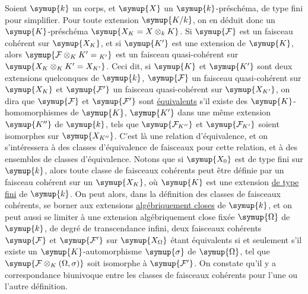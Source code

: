 Soient $\symup{k}$ un corps, et $\symup{X}$ un $\symup{k}$-préschéma, de type fini pour simplifier.
Pour toute extension $\symup{K/k}$, on en déduit donc un $\symup{K}$-préschéma
$\symup{X_K=X\otimes_k K}$. Si $\symup{\mathcal F}$ est un faisceau cohérent sur $\symup{X_K}$, et si
$\symup{K'}$ est une extension de $\symup{K}$, alors
$\symup{\mathcal F\otimes_K K'={}_{K'}}$ est un faisceau quasi-cohérent sur
$\symup{X_K\otimes_K K'=X_{K'}}$. Ceci dit, si $\symup{K}$ et $\symup{K'}$ sont deux extensions
quelconques de $\symup{k}$, $\symup{\mathcal F}$ un faisceau quasi-cohérent sur $\symup{X_K}$ et
$\symup{\mathcal F'}$
un faisceau quasi-cohérent sur $\symup{X_{K'}}$, on dira que $\symup{\mathcal F}$ et
$\symup{\mathcal F'}$ sont \uline{équivalents} s'il existe des $\symup{K}$-homomorphismes de
$\symup{K}$, $\symup{K'}$ dans une même extension $\symup{K''}$ de $\symup{k}$, tels que
$\symup{\mathcal F_{K''}}$ et $\symup{\mathcal F_{K'}}$ soient isomorphes sur $\symup{X_{K''}}$.
C'est là une relation d'équivalence, et on s'intéressera à des classes
d'équivalence de faisceaux pour cette relation, et à des ensembles de classes
d'équivalence. Notons que si $\symup{X_0}$ est de type fini sur
$\symup{k}$, alors toute classe de faisceaux cohérents peut être définie par un
faisceau cohérent sur un $\symup{X_K}$, où $\symup{K}$ est une extension \uline{de type fini} de $\symup{k}$.
On peut alors, dans la définition des classes de faisceaux cohérents, se borner
aux extensions \uline{algébriquement closes} de $\symup{k}$, et on peut aussi se limiter à une
extension algébriquement close fixée $\symup{\Omega}$ de $\symup{k}$, de degré de
transcendance infini, deux faisceaux cohérents $\symup{\mathcal F}$ et $\symup{\mathcal F'}$
sur $\symup{X_\Omega}$ étant équivalents si et seulement s'il existe un
$\symup{K}$-automorphisme $\symup{\sigma}$ de $\symup{\Omega}$, tel que
$\symup{\mathcal F\otimes_K(\Omega,\sigma)}$ soit isomorphe à $\symup{\mathcal F'}$.
On constate qu'il y a correspondance biunivoque entre les classes de faisceaux
cohérents pour l'une ou l'autre définition.

